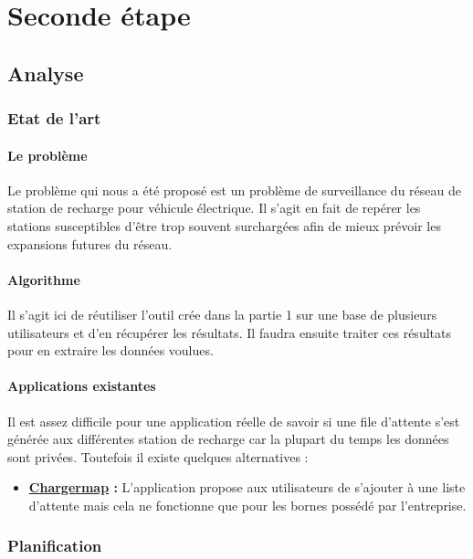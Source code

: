 \documentclass[a4paper, 12pt]{report}
\begin{document}
\chapter{Seconde étape}
\minitoc
{}
\clearpage


\section{Analyse}

\subsection{Etat de l'art}

\subsubsection{Le problème}
Le problème qui nous a été proposé est un problème de surveillance du réseau de station de recharge pour véhicule électrique. Il s'agit en fait de repérer les stations susceptibles d'être trop souvent surchargées afin de mieux prévoir les expansions futures du réseau.

\subsubsection{Algorithme}
Il s'agit ici de réutiliser l'outil crée dans la partie 1 sur une base de plusieurs utilisateurs et d'en récupérer les résultats. Il faudra ensuite traiter ces résultats pour en extraire les données voulues.

\subsubsection{Applications existantes}
Il est assez difficile pour une application réelle de savoir si une file d'attente s'est générée aux différentes station de recharge car la plupart du temps les données sont privées. Toutefois il existe quelques alternatives :

\begin{itemize}
    \item \textbf{\underline{Chargermap} :} L'application propose aux utilisateurs de s'ajouter à une liste d'attente mais cela ne fonctionne que pour les bornes possédé par l'entreprise.
\end{itemize}

\subsection{Planification}
\end{document}
